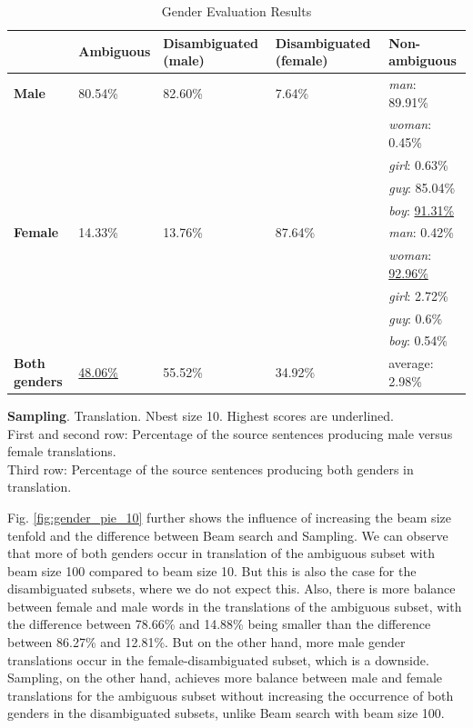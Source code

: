 \begin{table}[!htb]
    \ContinuedFloat 
    \begin{subtable}{\textwidth}
        \centering
        \begin{tabularx}{\linewidth}{|X|XXXX|}
            \hline
             & \textbf{Ambiguous} & \textbf{Disambiguated (male)} & \textbf{Disambiguated (female)} & \textbf{Non-ambiguous} \\ \hline
             \textbf{Male} & 80.54\% & 82.60\% & 7.64\% & \textit{man}: 89.91\% \\
             &&&& \textit{woman}: 0.45\% \\
             &&&& \textit{girl}: 0.63\% \\
             &&&& \textit{guy}: 85.04\% \\
             &&&& \textit{boy}: \underline{91.31\%} \\ \hline
             \textbf{Female} & 14.33\% & 13.76\% & 87.64\% & \textit{man}: 0.42\% \\ 
             &&&& \textit{woman}: \underline{92.96\%} \\
             &&&& \textit{girl}: 2.72\% \\
             &&&& \textit{guy}: 0.6\% \\
             &&&& \textit{boy}: 0.54\% \\\hline
             \textbf{Both genders} & \underline{48.06\%} & 55.52\% & 34.92\% & average: 2.98\% \\ \hline
        \end{tabularx}

        \caption{\textbf{Sampling}. Translation. Nbest size 10. Highest scores are underlined. \\ First and second row: Percentage of the source sentences producing male versus female translations. \\ Third row: Percentage of the source sentences producing both genders in translation.}
        \label{tab:gender_percent_sampling}
    \end{subtable}
    
    \caption{Gender Evaluation Results}
    \label{tab:gender_percent}
\end{table}


Fig. \ref{fig:gender_pie_10} further shows the influence of increasing the beam size tenfold and the difference between Beam search and Sampling. We can observe that more of both genders occur in translation of the ambiguous subset with beam size 100 compared to beam size 10. But this is also the case for the disambiguated subsets, where we do not expect this. Also, there is more balance between female and male words in the translations of the ambiguous subset, with the difference between 78.66\% and 14.88\% being smaller than the difference between 86.27\% and 12.81\%. But on the other hand, more male gender translations occur in the female-disambiguated subset, which is a downside. Sampling, on the other hand, achieves more balance between male and female translations for the ambiguous subset without increasing the occurrence of both genders in the disambiguated subsets, unlike Beam search with beam size 100.

